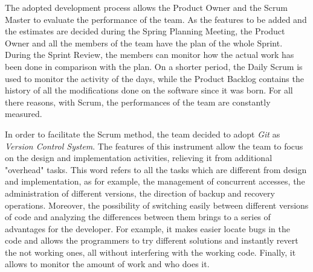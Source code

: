 		The adopted development process allows the Product Owner and the Scrum Master to evaluate the performance of the team. As the features to be added and the estimates are decided during the Spring Planning Meeting, the Product Owner and all the members of the team have the plan of the whole Sprint. During the Sprint Review, the members can monitor how the actual work has been done in comparison with the plan. On a shorter period, the Daily Scrum is used to monitor the activity of the days, while the Product Backlog contains the history of all the modifications done on the software since it was born. For all there reasons, with Scrum, the performances of the team are constantly measured.

		In order to facilitate the Scrum method, the team decided to adopt \mbox{\emph{Git}} as \emph{Version Control System}. 
		The features of this instrument allow the team to focus on the design and implementation activities, relieving it from additional "overhead" tasks.
		This word refers to all the tasks which are different from design and implementation, as for example, the management of concurrent accesses, the administration of different versions, the direction of backup and recovery operations.
		Moreover, the possibility of switching easily between different versions of code and analyzing the differences between them brings to a series of advantages for the developer.
		For example, it makes easier locate bugs in the code and allows the programmers to try different solutions and instantly revert the not working ones, all without interfering with the working code. 
		Finally, it allows to monitor the amount of work and who does it.

 
			
